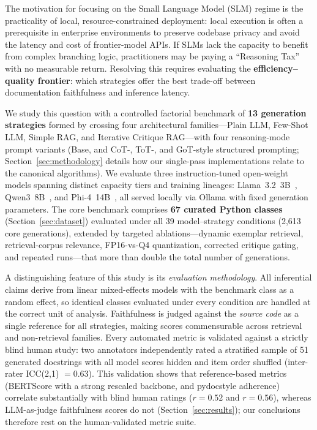 \documentclass[pdflatex,sn-mathphys-ay]{sn-jnl}%
\theoremstyle{thmstyleone}%
\theoremstyle{thmstyletwo}%
\theoremstyle{thmstylethree}%
\begin{document}
The motivation for focusing on the Small Language Model (SLM) regime is the practicality of local, resource-constrained deployment: local execution is often a prerequisite in enterprise environments to preserve codebase privacy and avoid the latency and cost of frontier-model APIs. If SLMs lack the capacity to benefit from complex branching logic, practitioners may be paying a ``Reasoning Tax'' with no measurable return. Resolving this requires evaluating the \textbf{efficiency--quality frontier}: which strategies offer the best trade-off between documentation faithfulness and inference latency.

{\color{blue}
We study this question with a controlled factorial benchmark of \textbf{13 generation strategies} formed by crossing four architectural families---Plain LLM, Few-Shot LLM, Simple RAG, and Iterative Critique RAG---with four reasoning-mode prompt variants (Base, and CoT-, ToT-, and GoT-style structured prompting; Section~\ref{sec:methodology} details how our single-pass implementations relate to the canonical algorithms). We evaluate three instruction-tuned open-weight models spanning distinct capacity tiers and training lineages: Llama~3.2~3B~\cite{grattafiori2024llama3herdmodels}, Qwen3~8B~\cite{yang2025qwen3technicalreport}, and Phi-4~14B~\cite{abdin2024phi4technicalreport}, all served locally via Ollama with fixed generation parameters. The core benchmark comprises \textbf{67 curated Python classes} (Section~\ref{sec:dataset}) evaluated under all 39 model--strategy conditions (2,613 core generations), extended by targeted ablations---dynamic exemplar retrieval, retrieval-corpus relevance, FP16-vs-Q4 quantization, corrected critique gating, and repeated runs---that more than double the total number of generations.

A distinguishing feature of this study is its \emph{evaluation methodology}. All inferential claims derive from linear mixed-effects models with the benchmark class as a random effect, so identical classes evaluated under every condition are handled at the correct unit of analysis. Faithfulness is judged against the \emph{source code} as a single reference for all strategies, making scores commensurable across retrieval and non-retrieval families. Every automated metric is validated against a strictly blind human study: two annotators independently rated a stratified sample of 51 generated docstrings with all model scores hidden and item order shuffled (inter-rater ICC(2,1) $=0.63$). This validation shows that reference-based metrics (BERTScore with a strong rescaled backbone, and pydocstyle adherence) correlate substantially with blind human ratings ($r=0.52$ and $r=0.56$), whereas LLM-as-judge faithfulness scores do not (Section~\ref{sec:results}); our conclusions therefore rest on the human-validated metric suite.

}
\end{document}
